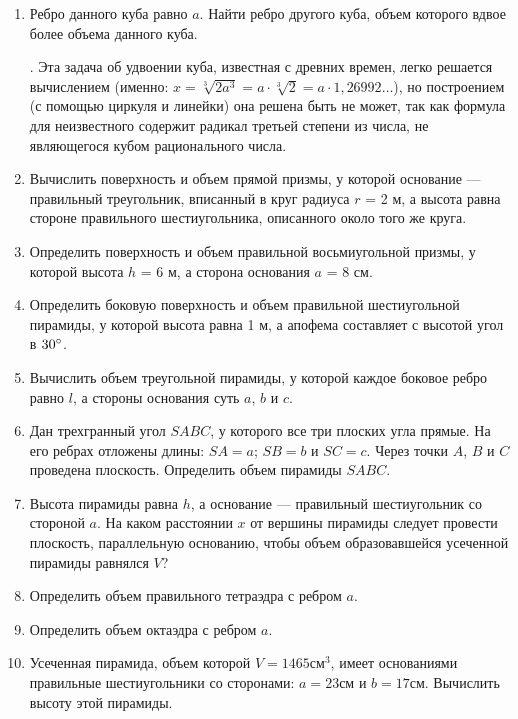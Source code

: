 \documentclass[twoside]{book}
\begin{document}
\begin{enumerate}

\item
Ребро данного куба равно $a$.
Найти ребро другого куба, объем которого вдвое более объема данного куба.

.
Эта задача об удвоении куба, известная с древних времен, легко решается вычислением (именно: $x=\sqrt[3]{2a^3}=a\cdot\sqrt[3]{2}=a\cdot1{,}26992 \dots $), но построением (с помощью циркуля и линейки) она решена быть не может, так как формула для неизвестного содержит радикал третьей степени из числа, не являющегося кубом рационального числа. %

\item
Вычислить поверхность и объем прямой призмы, у которой основание --- правильный треугольник, вписанный в круг радиуса $r$ = 2 м, а высота равна стороне правильного шестиугольника, описанного около того же круга.

\item
Определить поверхность и объем правильной восьмиугольной призмы, у которой высота $h$ = 6 м, а сторона основания $a$ = 8 см.

\item
Определить боковую поверхность и объем правильной шестиугольной пирамиды, у которой высота равна 1 м, а апофема составляет с высотой угол в $30\degree$.

\item
Вычислить объем треугольной пирамиды, у которой каждое боковое ребро равно $l$, а стороны основания суть $a$, $b$ и $c$.

\item
Дан трехгранный угол $SABC$, у которого все три плоских угла прямые.
На его ребрах отложены длины: $SA = a$;
$SB = b$ и $SC=c$.
Через точки $A$, $B$ и $C$ проведена плоскость.
Определить объем пирамиды $SABC$.

\item
Высота пирамиды равна $h$, а основание --- правильный шестиугольник со стороной $a$.
На каком расстоянии $x$ от вершины пирамиды следует провести плоскость, параллельную основанию, чтобы объем образовавшейся усеченной пирамиды равнялся $V$?

\item
Определить объем правильного тетраэдра с ребром $a$.

\item
Определить объем октаэдра с ребром $a$.

\item
Усеченная пирамида, объем которой $V = 1465 \text{см}^3$, имеет основаниями правильные шестиугольники со сторонами: $a = 23 \text{см}$ и $b = 17 \text{см}$.
Вычислить высоту этой пирамиды.


\end{enumerate}
\end{document}

